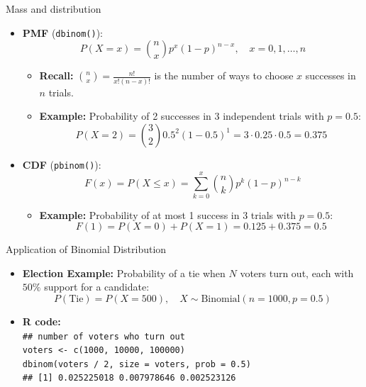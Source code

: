 \documentclass[aspectratio=169]{beamer}
\begin{document}
\begin{frame}{Mass and distribution}
    \begin{itemize}
        \item \textbf{PMF} (\texttt{dbinom()}):
        \[
        P(X = x) = \binom{n}{x} p^x (1-p)^{n-x}, \quad x = 0, 1, \ldots, n
        \]
        \begin{itemize}
            \item[$\bullet$] \textbf{Recall:} \(\binom{n}{x} = \frac{n!}{x!(n-x)!}\) is the number of ways to choose \(x\) successes in \(n\) trials.
            \item[$\bullet$] \textbf{Example:} Probability of 2 successes in 3 independent trials with \(p = 0.5\):
            \[
            P(X = 2) = \binom{3}{2} 0.5^2 (1-0.5)^1 = 3 \cdot 0.25 \cdot 0.5 = 0.375
            \]
        \end{itemize}
        \item \textbf{CDF} (\texttt{pbinom()}):
        \[
        F(x) = P(X \leq x) = \sum_{k=0}^x \binom{n}{k} p^k (1-p)^{n-k}
        \]
        \begin{itemize}
            \item[$\bullet$] \textbf{Example:} Probability of at most 1 success in 3 trials with \(p = 0.5\):
            \[
            F(1) = P(X = 0) + P(X = 1) = 0.125 + 0.375 = 0.5
            \] 
        \end{itemize}
        
    \end{itemize}
\end{frame}

\begin{frame}{Application of Binomial Distribution}
    \begin{itemize}
        \item \textbf{Election Example:} Probability of a tie when $N$ voters turn out, each with $50\%$ support for a candidate:
        \[
        P(\text{Tie}) = P(X = 500), \quad X \sim \text{Binomial}(n=1000, p=0.5)
        \]
        \item \textbf{R code:} \\
        \texttt{\#\# number of voters who turn out \\
            voters <- c(1000, 10000, 100000) \\
            dbinom(voters / 2, size = voters, prob = 0.5) \\
            \#\# [1] 0.025225018 0.007978646 0.002523126
        }
    \end{itemize}
\end{frame}
\end{document}

